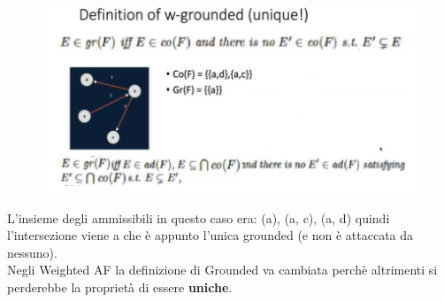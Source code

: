 \begin{figure}[htp]
	\centering
    \includegraphics[width=12cm, keepaspectratio]{img/Cap6/w-gounded2.png}
\end{figure}
L’insieme degli ammissibili in questo caso era: (a), (a, c), (a, d) quindi l’intersezione viene a che è appunto l’unica grounded (e non è attaccata da nessuno).
\\Negli Weighted AF la definizione di Grounded va cambiata perchè altrimenti si perderebbe la proprietà di essere \textbf{uniche}.
